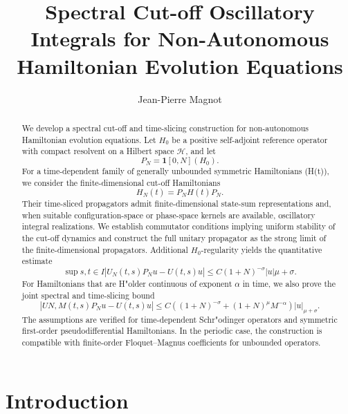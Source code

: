 \documentclass[11pt]{amsart}
\title[Spectral cut-off oscillatory integrals]
{Spectral Cut-off Oscillatory Integrals for Non-Autonomous Hamiltonian Evolution Equations}
\author{Jean-Pierre Magnot}
\date{}
\theoremstyle{plain}
\theoremstyle{definition}
\theoremstyle{remark}
\newcommand{\Hilb}{\mathcal H}
\begin{document}
\begin{abstract}
We develop a spectral cut-off and time-slicing construction for non-autonomous Hamiltonian evolution equations. Let \(H_0\) be a positive self-adjoint reference operator with compact resolvent on a Hilbert space \(\Hilb\), and let
$$
P_N=\mathbf{1}{[0,N]}(H_0).
$$
For a time-dependent family of generally unbounded symmetric Hamiltonians (H(t)), we consider the finite-dimensional cut-off Hamiltonians
$$
H_N(t)=P_NH(t)P_N.
$$
Their time-sliced propagators admit finite-dimensional state-sum representations and, when suitable configuration-space or phase-space kernels are available, oscillatory integral realizations. We establish commutator conditions implying uniform stability of the cut-off dynamics and construct the full unitary propagator as the strong limit of the finite-dimensional propagators. Additional \(H_0\)-regularity yields the quantitative estimate
$$
\sup{s,t\in I}
|U_N(t,s)P_Nu-U(t,s)u|
\leq
C(1+N)^{-\sigma}|u|{\mu+\sigma}.
$$
For Hamiltonians that are H"older continuous of exponent \(\alpha\) in time, we also prove the joint spectral and time-slicing bound
$$
|U{N,M}(t,s)P_Nu-U(t,s)u|
\leq
C\left((1+N)^{-\sigma}+(1+N)^\mu M^{-\alpha}\right)
|u|_{\mu+\sigma}.
$$
The assumptions are verified for time-dependent Schr"odinger operators and symmetric first-order pseudodifferential Hamiltonians. In the periodic case, the construction is compatible with finite-order Floquet--Magnus coefficients for unbounded operators.
\end{abstract}
\maketitle

\section{Introduction}
\label{sec:introduction}
\end{document}
